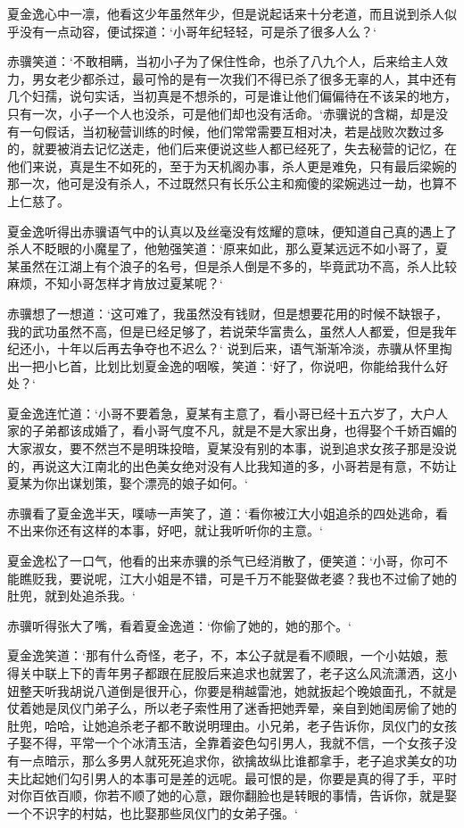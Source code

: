 夏金逸心中一凛，他看这少年虽然年少，但是说起话来十分老道，而且说到杀人似乎没有一点动容，便试探道：‘小哥年纪轻轻，可是杀了很多人么？‘

赤骥笑道：‘不敢相瞒，当初小子为了保住性命，也杀了八九个人，后来给主人效力，男女老少都杀过，最可怜的是有一次我们不得已杀了很多无辜的人，其中还有几个妇孺，说句实话，当初真是不想杀的，可是谁让他们偏偏待在不该呆的地方，只有一次，小子一个人也没杀，可是他们却也没有活命。‘赤骥说的含糊，却是没有一句假话，当初秘营训练的时候，他们常常需要互相对决，若是战败次数过多的，就要被消去记忆送走，他们后来便说这些人都已经死了，失去秘营的记忆，在他们来说，真是生不如死的，至于为天机阁办事，杀人更是难免，只有最后梁婉的那一次，他可是没有杀人，不过既然只有长乐公主和痴傻的梁婉逃过一劫，也算不上仁慈了。

夏金逸听得出赤骥语气中的认真以及丝毫没有炫耀的意味，便知道自己真的遇上了杀人不眨眼的小魔星了，他勉强笑道：‘原来如此，那么夏某远远不如小哥了，夏某虽然在江湖上有个浪子的名号，但是杀人倒是不多的，毕竟武功不高，杀人比较麻烦，不知小哥怎样才肯放过夏某呢？‘

赤骥想了一想道：‘这可难了，我虽然没有钱财，但是想要花用的时候不缺银子，我的武功虽然不高，但是已经足够了，若说荣华富贵么，虽然人人都爱，但是我年纪还小，十年以后再去争夺也不迟么？‘ 说到后来，语气渐渐冷淡，赤骥从怀里掏出一把小匕首，比划比划夏金逸的咽喉，笑道：‘好了，你说吧，你能给我什么好处？‘

夏金逸连忙道：‘小哥不要着急，夏某有主意了，看小哥已经十五六岁了，大户人家的子弟都该成婚了，看小哥气度不凡，就是不是大家出身，也得娶个千娇百媚的大家淑女，要不然岂不是明珠投暗，夏某没有别的本事，说到追求女孩子那是没说的，再说这大江南北的出色美女绝对没有人比我知道的多，小哥若是有意，不妨让夏某为你出谋划策，娶个漂亮的娘子如何。‘

赤骥看了夏金逸半天，噗哧一声笑了，道：‘看你被江大小姐追杀的四处逃命，看不出来你还有这样的本事，好吧，就让我听听你的主意。‘

夏金逸松了一口气，他看的出来赤骥的杀气已经消散了，便笑道：‘小哥，你可不能瞧贬我，要说呢，江大小姐是不错，可是千万不能娶做老婆？我也不过偷了她的肚兜，就到处追杀我。‘

赤骥听得张大了嘴，看着夏金逸道：‘你偷了她的，她的那个。‘

夏金逸笑道：‘那有什么奇怪，老子，不，本公子就是看不顺眼，一个小姑娘，惹得关中联上下的青年男子都跟在屁股后来追求也就罢了，老子这么风流潇洒，这小妞整天听我胡说八道倒是很开心，你要是稍越雷池，她就扳起个晚娘面孔，不就是仗着她是凤仪门弟子么，所以老子索性用了迷香把她弄晕，亲自到她闺房偷了她的肚兜，哈哈，让她追杀老子都不敢说明理由。小兄弟，老子告诉你，凤仪门的女孩子娶不得，平常一个个冰清玉洁，全靠着姿色勾引男人，我就不信，一个女孩子没有一点暗示，那么多男人就死死追求你，欲擒故纵比谁都拿手，老子追求美女的功夫比起她们勾引男人的本事可是差的远呢。最可恨的是，你要是真的得了手，平时对你百依百顺，你若不顺了她的心意，跟你翻脸也是转眼的事情，告诉你，就是娶一个不识字的村姑，也比娶那些凤仪门的女弟子强。‘

